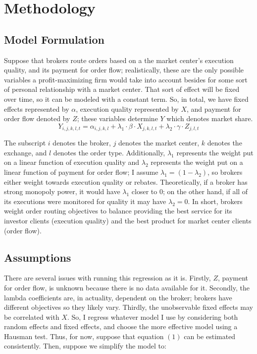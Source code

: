 \documentclass[12pt,a4paper]{article}
\begin{document}
\pagebreak	
\section{Methodology}

	\subsection{Model Formulation}

		Suppose that brokers route orders based on a the market center's execution quality, and its payment for order flow; realistically, these are the only possible variables a profit-maximizing firm would take into account besides for some sort of personal relationship with a market center. That sort of effect will be fixed over time, so it can be modeled with a constant term. So, in total, we have fixed effects represented by $\alpha$, execution quality represented by $X$, and payment for order flow denoted by $Z$; these variables determine $Y$ which denotes market share. 
		\begin{equation}
		Y_{i, j, k, l, t} = \alpha_{i,j,k,l} + \lambda_{1} \cdot \beta \cdot X_{j, k, l, t} + \lambda_{2} \cdot \gamma \cdot Z_{j, l, t}
		\end{equation}	
		
		The subscript $i$ denotes the broker, $j$ denotes the market center, $k$ denotes the exchange, and $l$ denotes the order type. Additionally, $\lambda_1$ represents the weight put on a linear function of execution quality and $\lambda_2$ represents the weight put on a linear function of payment for order flow; I assume $\lambda_1 = (1-\lambda_2)$, so brokers either weight towards execution quality or rebates. Theoretically, if a broker has strong monopoly power, it would have $\lambda_1$ closer to $0$; on the other hand, if all of its executions were monitored for quality it may have $\lambda_2 = 0$. In short, brokers weight order routing objectives to balance providing the best service for its investor clients (execution quality) and the best product for market center clients (order flow).
	
	\subsection{Assumptions}	
		
		There are several issues with running this regression as it is. Firstly, $Z$, payment for order flow, is unknown because there is no data available for it. Secondly, the lambda coefficients are, in actuality, dependent on the broker; brokers have different objectives so they likely vary. Thirdly, the unobservable fixed effects may be correlated with $X$. So, I regress whatever model I use by considering both random effects and fixed effects, and choose the more effective model using a Hausman test. Thus, for now, suppose that equation $(1)$ can be estimated consistently. Then, suppose we simplify the model to:
		
\end{document}
